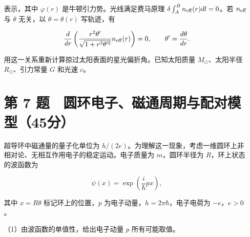 \documentclass[12pt,a4paper,fontset=fandol]{ctexart}
\begin{document}
表示，其中 \(\varphi(r)\) 是牛顿引力势。光线满足费马原理
\(\delta\int_A^B n_{\rm eff}(r)dl=0\)。若 \(n_{\rm eff}\) 与 \(\theta\)
无关，以 \(\theta=\theta(r)\) 写轨迹，有

\[\frac d{dr}\left(
\frac{r^2\theta'}{\sqrt{1+r^2\theta'^2}}n_{\rm eff}(r)
\right)=0,\qquad\theta'=\frac{d\theta}{dr}.\]

用这一关系重新计算掠过太阳表面的星光偏折角。已知太阳质量
\(M_\odot\)、太阳半径 \(R_\odot\)、引力常量 \(G\) 和光速 \(c\)。

\clearpage

\section{第 7
题　圆环电子、磁通周期与配对模型（45分）}\label{ux7b2c-7-ux9898-ux5706ux73afux7535ux5b50ux78c1ux901aux5468ux671fux4e0eux914dux5bf9ux6a21ux578b45ux5206}

超导环中磁通量的量子化单位为
\(h/(2e)\)。为理解这一现象，考虑一维圆环上非相对论、无相互作用电子的稳定运动。电子质量为
\(m\)，圆环半径为 \(R\)，环上状态的波函数为

\[\psi(x)=\exp\left(\frac i\hbar px\right),\]

其中 \(x=R\theta\) 标记环上的位置，\(p\)
为电子动量，\(h=2\pi\hbar\)，电子电荷为 \(-e\)，\(e>0\)。

\begin{center}
\begin{minipage}{\linewidth}
\centering\begingroup
{}
\ifdim\wd\diagrambox>.88\linewidth
\sbox{\diagrambox}{\resizebox{.88\linewidth}{!}{\usebox{\diagrambox}}}
\fi
\ifdim\ht\diagrambox>.40\textheight
\resizebox{!}{.40\textheight}{\usebox{\diagrambox}}
\else\usebox{\diagrambox}\fi
\par{}
\endgroup\end{minipage}
\end{center}

（1）由波函数的单值性，给出电子动量 \(p\) 所有可能取值。
\end{document}
